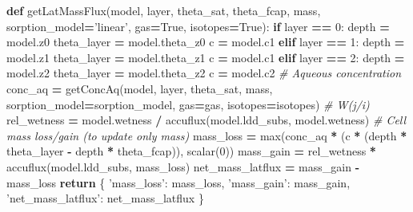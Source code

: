 \documentclass[]{article}
\newenvironment{Shaded}{\begin{snugshade}}{\end{snugshade}}
\newcommand{\KeywordTok}[1]{\textcolor[rgb]{0.13,0.29,0.53}{\textbf{#1}}}
\newcommand{\DecValTok}[1]{\textcolor[rgb]{0.00,0.00,0.81}{#1}}
\newcommand{\StringTok}[1]{\textcolor[rgb]{0.31,0.60,0.02}{#1}}
\newcommand{\CommentTok}[1]{\textcolor[rgb]{0.56,0.35,0.01}{\textit{#1}}}
\newcommand{\VariableTok}[1]{\textcolor[rgb]{0.00,0.00,0.00}{#1}}
\newcommand{\ControlFlowTok}[1]{\textcolor[rgb]{0.13,0.29,0.53}{\textbf{#1}}}
\newcommand{\OperatorTok}[1]{\textcolor[rgb]{0.81,0.36,0.00}{\textbf{#1}}}
\newcommand{\BuiltInTok}[1]{#1}
\newcommand{\NormalTok}[1]{#1}
\begin{document}
\begin{Shaded}
\begin{Highlighting}[]
\KeywordTok{def}\NormalTok{ getLatMassFlux(model, layer, theta_sat, theta_fcap,}
\NormalTok{                   mass, sorption_model}\OperatorTok{=}\StringTok{'linear'}\NormalTok{, gas}\OperatorTok{=}\VariableTok{True}\NormalTok{, isotopes}\OperatorTok{=}\VariableTok{True}\NormalTok{):}
    \ControlFlowTok{if}\NormalTok{ layer }\OperatorTok{==} \DecValTok{0}\NormalTok{:}
\NormalTok{        depth }\OperatorTok{=}\NormalTok{ model.z0}
\NormalTok{        theta_layer }\OperatorTok{=}\NormalTok{ model.theta_z0}
\NormalTok{        c }\OperatorTok{=}\NormalTok{ model.c1}
    \ControlFlowTok{elif}\NormalTok{ layer }\OperatorTok{==} \DecValTok{1}\NormalTok{:}
\NormalTok{        depth }\OperatorTok{=}\NormalTok{ model.z1}
\NormalTok{        theta_layer }\OperatorTok{=}\NormalTok{ model.theta_z1}
\NormalTok{        c }\OperatorTok{=}\NormalTok{ model.c1}
    \ControlFlowTok{elif}\NormalTok{ layer }\OperatorTok{==} \DecValTok{2}\NormalTok{:}
\NormalTok{        depth }\OperatorTok{=}\NormalTok{ model.z2}
\NormalTok{        theta_layer }\OperatorTok{=}\NormalTok{ model.theta_z2}
\NormalTok{        c }\OperatorTok{=}\NormalTok{ model.c2}
    \CommentTok{# Aqueous concentration}
\NormalTok{    conc_aq }\OperatorTok{=}\NormalTok{ getConcAq(model, layer, theta_sat, mass,}
\NormalTok{                        sorption_model}\OperatorTok{=}\NormalTok{sorption_model, gas}\OperatorTok{=}\NormalTok{gas, isotopes}\OperatorTok{=}\NormalTok{isotopes)}
    \CommentTok{# W(j/i)}
\NormalTok{    rel_wetness }\OperatorTok{=}\NormalTok{ model.wetness }\OperatorTok{/}\NormalTok{ accuflux(model.ldd_subs, model.wetness)}
    \CommentTok{# Cell mass loss/gain (to update only mass)}
\NormalTok{    mass_loss }\OperatorTok{=} \BuiltInTok{max}\NormalTok{(conc_aq }\OperatorTok{*}\NormalTok{ (c }\OperatorTok{*}\NormalTok{ (depth }\OperatorTok{*}\NormalTok{ theta_layer }\OperatorTok{-}\NormalTok{ depth }\OperatorTok{*}\NormalTok{ theta_fcap)), scalar(}\DecValTok{0}\NormalTok{))}
\NormalTok{    mass_gain }\OperatorTok{=}\NormalTok{ rel_wetness }\OperatorTok{*}\NormalTok{ accuflux(model.ldd_subs, mass_loss)}
\NormalTok{    net_mass_latflux }\OperatorTok{=}\NormalTok{ mass_gain }\OperatorTok{-}\NormalTok{ mass_loss}
    \ControlFlowTok{return}\NormalTok{ \{}
        \StringTok{'mass_loss'}\NormalTok{: mass_loss,}
        \StringTok{'mass_gain'}\NormalTok{: mass_gain,}
        \StringTok{'net_mass_latflux'}\NormalTok{: net_mass_latflux}
\NormalTok{    \}}
\end{Highlighting}
\end{Shaded}
\end{document}

